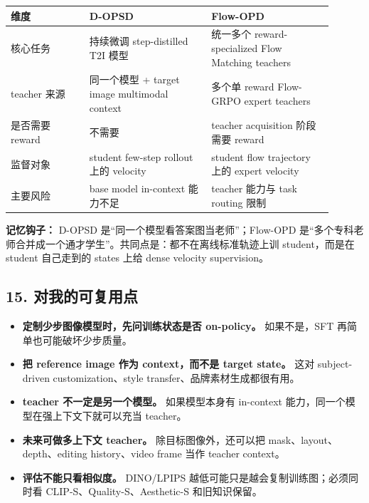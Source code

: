 \begin{center}
\small
\begin{tabular}{p{0.22\linewidth}p{0.34\linewidth}p{0.34\linewidth}}
\toprule
\textbf{维度} & \textbf{D-OPSD} & \textbf{Flow-OPD} \\
\midrule
核心任务 & 持续微调 step-distilled T2I 模型 & 统一多个 reward-specialized Flow Matching teachers \\
teacher 来源 & 同一个模型 + target image multimodal context & 多个单 reward Flow-GRPO expert teachers \\
是否需要 reward & 不需要 & teacher acquisition 阶段需要 reward \\
监督对象 & student few-step rollout 上的 velocity & student flow trajectory 上的 expert velocity \\
主要风险 & base model in-context 能力不足 & teacher 能力与 task routing 限制 \\
\bottomrule
\end{tabular}
\end{center}

\begin{intubox}
\textbf{记忆钩子：} D-OPSD 是“同一个模型看答案图当老师”；Flow-OPD 是“多个专科老师合并成一个通才学生”。共同点是：都不在离线标准轨迹上训 student，而是在 student 自己走到的 states 上给 dense velocity supervision。
\end{intubox}

\subsection{15. 对我的可复用点}

\begin{itemize}[leftmargin=1.5em]
  \item \textbf{定制少步图像模型时，先问训练状态是否 on-policy。} 如果不是，SFT 再简单也可能破坏少步质量。
  \item \textbf{把 reference image 作为 context，而不是 target state。} 这对 subject-driven customization、style transfer、品牌素材生成都很有用。
  \item \textbf{teacher 不一定是另一个模型。} 如果模型本身有 in-context 能力，同一个模型在强上下文下就可以充当 teacher。
  \item \textbf{未来可做多上下文 teacher。} 除目标图像外，还可以把 mask、layout、depth、editing history、video frame 当作 teacher context。
  \item \textbf{评估不能只看相似度。} DINO/LPIPS 越低可能只是越会复制训练图；必须同时看 CLIP-S、Quality-S、Aesthetic-S 和旧知识保留。
\end{itemize}

